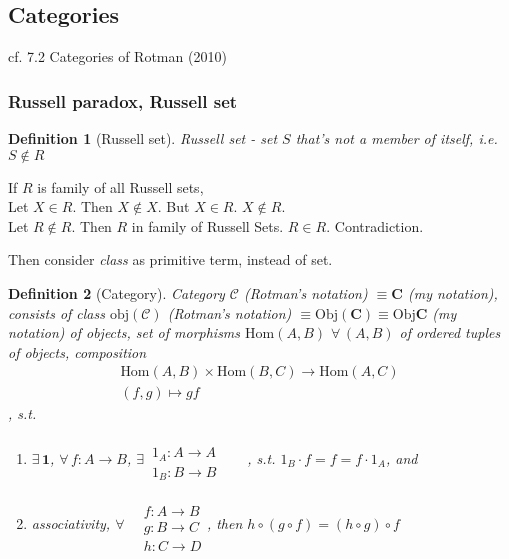 \documentclass[10pt]{amsart}
\newtheorem{definition}{Definition}
\begin{document}
\begin{multicols*}{2}
\subsection{Categories}

cf. 7.2 Categories of Rotman (2010) \cite{JRotman2010}

\subsubsection{Russell paradox, Russell set}  

\begin{definition}[Russell set]
Russell set  - set $S$ that's not a member of itself, i.e. $S\notin R$
\end{definition}

If $R$ is family of all Russell sets,  \\
Let $X\in R$.  Then $X\notin X$.  But $X\in R$.  $X\notin R$.  \\
Let $R\notin R$.  Then $R$ in family of Russell Sets.  $R\in R$.  Contradiction.  

Then consider \emph{class} as primitive term, instead of set.  

\begin{definition}[Category]
Category $\mathcal{C}$ (Rotman's notation) $\equiv \mathbf{C}$ (my notation), consists of class $\text{obj}(\mathcal{C})$ (Rotman's notation) $\equiv \text{Obj}(\mathbf{C}) \equiv \text{Obj}\mathbf{C}$ (my notation) of objects, set of  morphisms $\text{Hom}(A,B)$ $\forall \,  (A,B)$ of ordered tuples of objects, composition 
\[
\begin{gathered} 
	\text{Hom}(A,B)\times \text{Hom}(B ,C) \to \text{Hom}(A,C) \\
(f,g)\mapsto gf \end{gathered}
\], s.t.
\begin{enumerate}
\item $\exists \, \mathbf{1}$, $\forall \, f:A\to B$, $\exists \, \begin{aligned} & \quad \\ 
1_A : A \to A \\
1_B : B \to B \end{aligned}$, s.t. $1_B \cdot f = f= f\cdot 1_A$, and 
\item associativity, $\forall \, \begin{aligned} & \quad \\
& f : A\to B \\
& g: B\to C \\
& h: C\to D \end{aligned}$, then $h\circ (g\circ f) = (h\circ g) \circ f$ 
\end{enumerate}


\end{definition}
\end{multicols*}
\end{document}
